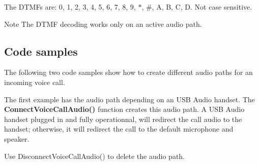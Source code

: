 The D\+T\+M\+Fs are\+: 0, 1, 2, 3, 4, 5, 6, 7, 8, 9, $\ast$, \#, A, B, C, D. Not case sensitive.

\begin{DoxyNote}{Note}
The D\+T\+M\+F decoding works only on an active audio path.
\end{DoxyNote}
\hypertarget{c_audio_le_audio_samples}{}\subsection{Code samples}\label{c_audio_le_audio_samples}
The following two code samples show how to create different audio paths for an incoming voice call.

The first example has the audio path depending on an U\+S\+B Audio handset. The {\bfseries Connect\+Voice\+Call\+Audio()} function creates this audio path. A U\+S\+B Audio handset plugged in and fully operationnal, will redirect the call audio to the handset; otherwise, it will redirect the call to the default microphone and speaker.

Use Disconnect\+Voice\+Call\+Audio() to delete the audio path.



